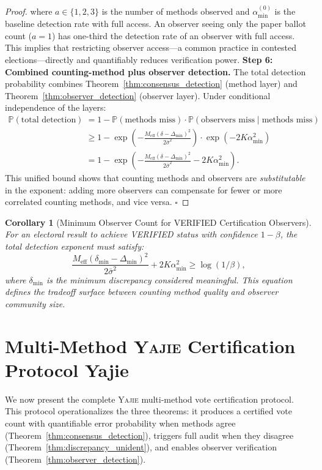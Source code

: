 \documentclass[11pt,a4paper]{article}
\newtheorem{corollary}[theorem]{Corollary}
\theoremstyle{definition}
\newcommand{\Yajie}{\textsc{Yajie}}
\newcommand{\Pbb}{\mathbb{P}}
\begin{document}
\begin{proof}
where $a \in \{1, 2, 3\}$ is the number of methods observed and $\alpha_{\min}^{(0)}$ is the baseline detection rate with full access. An observer seeing only the paper ballot count ($a = 1$) has one-third the detection rate of an observer with full access. This implies that restricting observer access---a common practice in contested elections---directly and quantifiably reduces verification power.
\textbf{Step 6: Combined counting-method plus observer detection.} The total detection probability combines Theorem~\ref{thm:consensus_detection} (method layer) and Theorem~\ref{thm:observer_detection} (observer layer). Under conditional independence of the layers:
\begin{align}
    \Pbb(\text{total detection}) &= 1 - \Pbb(\text{methods miss}) \cdot \Pbb(\text{observers miss} \mid \text{methods miss}) \\
    &\geq 1 - \exp\left(-\frac{M_{\text{eff}} (\delta - \Delta_{\min})^2}{2\bar{\sigma}^2}\right) \cdot \exp(-2K \alpha_{\min}^2) \\
    &= 1 - \exp\left(-\frac{M_{\text{eff}} (\delta - \Delta_{\min})^2}{2\bar{\sigma}^2} - 2K \alpha_{\min}^2\right).
    \label{eq:total_detection}
\end{align}
This unified bound shows that counting methods and observers are \textit{substitutable} in the exponent: adding more observers can compensate for fewer or more correlated counting methods, and vice versa. $\square$
\end{proof}
\begin{corollary}[Minimum Observer Count for VERIFIED Certification Observers]
\label{cor:observer_verified}
For an electoral result to achieve VERIFIED status with confidence $1 - \beta$, the total detection exponent must satisfy:
\begin{equation}
    \frac{M_{\text{eff}} (\delta_{\min} - \Delta_{\min})^2}{2\bar{\sigma}^2} + 2K \alpha_{\min}^2 \geq \log(1/\beta),
    \label{eq:verified_condition}
\end{equation}
where $\delta_{\min}$ is the minimum discrepancy considered meaningful. This equation defines the tradeoff surface between counting method quality and observer community size.
\end{corollary}
\section{Multi-Method \Yajie{} Certification Protocol Yajie}
\label{sec:protocol}
We now present the complete \Yajie{} multi-method vote certification protocol. This protocol operationalizes the three theorems: it produces a certified vote count with quantifiable error probability when methods agree (Theorem~\ref{thm:consensus_detection}), triggers full audit when they disagree (Theorem~\ref{thm:discrepancy_unident}), and enables observer verification (Theorem~\ref{thm:observer_detection}).
\end{document}
